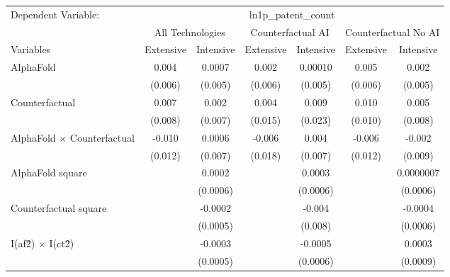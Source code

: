 \begingroup
\centering
\begin{tabular}{lcccccc}
   \tabularnewline \midrule \midrule
   Dependent Variable: & \multicolumn{6}{c}{ln1p\_patent\_count}\\
 & \multicolumn{2}{c}{All Technologies} & \multicolumn{2}{c}{Counterfactual AI} & \multicolumn{2}{c}{Counterfactual No AI} \\
\cmidrule(lr){1-1}\cmidrule(lr){2-3} \cmidrule(lr){4-5} \cmidrule(lr){6-7}
Variables & \multicolumn{1}{c}{Extensive} & \multicolumn{1}{c}{Intensive} & \multicolumn{1}{c}{Extensive} & \multicolumn{1}{c}{Intensive} & \multicolumn{1}{c}{Extensive} & \multicolumn{1}{c}{Intensive} \\
\cmidrule(lr){1-1}\cmidrule(lr){2-2} \cmidrule(lr){3-3} \cmidrule(lr){4-4} \cmidrule(lr){5-5} \cmidrule(lr){6-6} \cmidrule(lr){7-7}
   AlphaFold                          & 0.004   & 0.0007   & 0.002   & 0.00010  & 0.005   & 0.002\\   
                                      & (0.006) & (0.005)  & (0.006) & (0.005)  & (0.006) & (0.005)\\   
   Counterfactual                     & 0.007   & 0.002    & 0.004   & 0.009    & 0.010   & 0.005\\   
                                      & (0.008) & (0.007)  & (0.015) & (0.023)  & (0.010) & (0.008)\\   
   AlphaFold $\times$ Counterfactual  & -0.010  & 0.0006   & -0.006  & 0.004    & -0.006  & -0.002\\   
                                      & (0.012) & (0.007)  & (0.018) & (0.007)  & (0.012) & (0.009)\\   
   AlphaFold square                   &         & 0.0002   &         & 0.0003   &         & 0.0000007\\   
                                      &         & (0.0006) &         & (0.0006) &         & (0.0006)\\   
   Counterfactual square              &         & -0.0002  &         & -0.004   &         & -0.0004\\   
                                      &         & (0.0005) &         & (0.008)  &         & (0.0006)\\   
   I(af\^2) $\times$ I(ct\^2)         &         & -0.0003  &         & -0.0005  &         & 0.0003\\   
                                      &         & (0.0005) &         & (0.0006) &         & (0.0009)\\   
   \midrule

\end{tabular}
